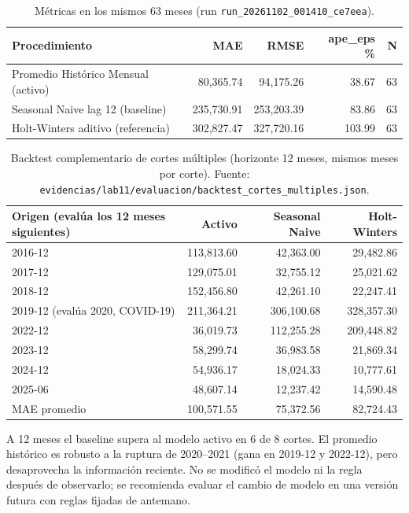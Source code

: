 \documentclass[11pt,a4paper]{article}
\newcommand{\cod}[1]{\texttt{\small #1}}
\begin{document}
\begin{table}[H]\centering\small
\caption{Métricas en los mismos 63 meses (run \cod{run\_20261102\_001410\_ce7eea}).}
\begin{tabular}{@{}lrrrr@{}}\toprule
Procedimiento & MAE & RMSE & ape\_eps \% & N\\\midrule
Promedio Histórico Mensual (activo) & 80{,}365.74 & 94{,}175.26 & 38.67 & 63\\
Seasonal Naive lag 12 (baseline) & 235{,}730.91 & 253{,}203.39 & 83.86 & 63\\
Holt-Winters aditivo (referencia) & 302{,}827.47 & 327{,}720.16 & 103.99 & 63\\
\bottomrule\end{tabular}
\end{table}

\begin{table}[H]\centering\small
\caption{Backtest complementario de cortes múltiples (horizonte 12 meses, mismos meses por corte). Fuente: \cod{evidencias/lab11/evaluacion/backtest\_cortes\_multiples.json}.}
\begin{tabular}{@{}lrrr@{}}\toprule
Origen (evalúa los 12 meses siguientes) & Activo & Seasonal Naive & Holt-Winters\\\midrule
2016-12 & 113{,}813.60 & 42{,}363.00 & 29{,}482.86\\
2017-12 & 129{,}075.01 & 32{,}755.12 & 25{,}021.62\\
2018-12 & 152{,}456.80 & 42{,}261.10 & 22{,}247.41\\
2019-12 (evalúa 2020, COVID-19) & 211{,}364.21 & 306{,}100.68 & 328{,}357.30\\
2022-12 & 36{,}019.73 & 112{,}255.28 & 209{,}448.82\\
2023-12 & 58{,}299.74 & 36{,}983.58 & 21{,}869.34\\
2024-12 & 54{,}936.17 & 18{,}024.33 & 10{,}777.61\\
2025-06 & 48{,}607.14 & 12{,}237.42 & 14{,}590.48\\\midrule
MAE promedio & 100{,}571.55 & 75{,}372.56 & 82{,}724.43\\
\bottomrule\end{tabular}
\end{table}
\noindent A 12 meses el baseline supera al modelo activo en 6 de 8 cortes. El promedio histórico es robusto a la ruptura de 2020--2021 (gana en 2019-12 y 2022-12), pero desaprovecha la información reciente. No se modificó el modelo ni la regla después de observarlo; se recomienda evaluar el cambio de modelo en una versión futura con reglas fijadas de antemano.
\end{document}
